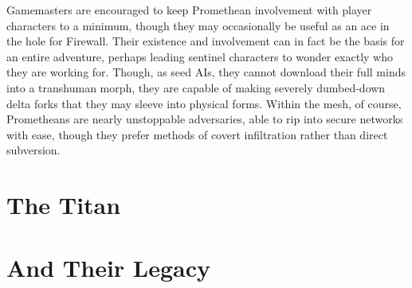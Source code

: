 Gamemasters are encouraged to keep Promethean 
involvement with player characters to a minimum, 
though they may occasionally be useful as an ace in 
the hole for Firewall. Their existence and involvement
can in fact be the basis for an entire adventure,
perhaps leading sentinel characters to wonder exactly 
who they are working for. Though, as seed AIs, they 
cannot download their full minds into a transhuman 
morph, they are capable of making severely dumbed-down
delta forks that they may sleeve into physical
forms. Within the mesh, of course, Prometheans are 
nearly unstoppable adversaries, able to rip into secure 
networks with ease, though they prefer methods of 
covert infiltration rather than direct subversion.

\section{The Titan}


\section{ And Their Legacy}

